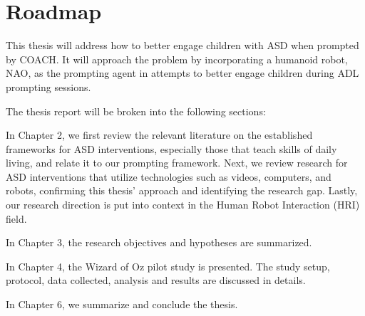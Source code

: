 \section{Roadmap}

This thesis will address how to better engage children with ASD when prompted by COACH.  It will approach the problem by incorporating a humanoid robot, NAO, as the prompting agent in attempts to better engage children during ADL prompting sessions.


The thesis report will be broken into the following sections:


In Chapter 2, we first review the relevant literature on the established frameworks for ASD interventions, especially those that teach skills of daily living, and relate it to our prompting framework.  Next, we review research for ASD interventions that utilize technologies such as videos, computers, and robots, confirming this thesis' approach and identifying the research gap.  Lastly, our research direction is put into context in the Human Robot Interaction (HRI) field.


In Chapter 3, the research objectives and hypotheses are summarized.

In Chapter 4, the Wizard of Oz pilot study is presented.  The study setup, protocol, data collected, analysis and results are discussed in details.

In Chapter 6, we summarize and conclude the thesis.


